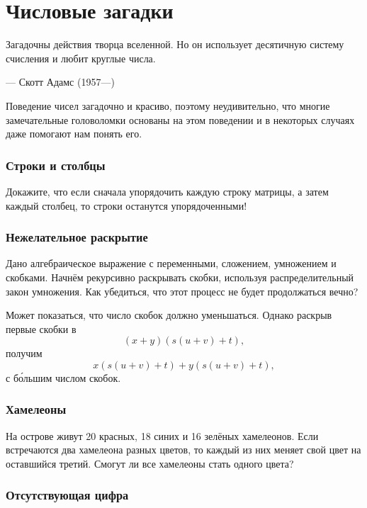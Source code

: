\chapter{Числовые загадки}



\setlength{\epigraphwidth}{.70\textwidth}
\epigraph{Загадочны действия творца вселенной.
Но он использует десятичную систему счисления и любит круглые
числа.
}{--- Скотт Адамс (1957---)}


Поведение чисел загадочно и красиво, поэтому неудивительно, что многие замечательные головоломки основаны на этом поведении и в некоторых случаях даже помогают нам понять его.

\subsection*{Строки и столбцы}

Докажите, что если сначала упорядочить каждую строку матрицы, а затем каждый столбец, то строки останутся упорядоченными!

\subsection*{Нежелательное раскрытие}

Дано алгебраическое выражение с переменными, сложением, умножением и скобками.
Начнём рекурсивно раскрывать скобки, используя распределительный закон умножения.
Как убедиться, что этот процесс не будет продолжаться вечно?

Может показаться, что число скобок должно уменьшаться.
Однако раскрыв первые скобки в
\[(x + y)(s(u + v) + t),\]
получим
\[x(s(u + v) + t) + y(s(u + v) + t),\]
с б\'{о}льшим числом скобок.

\subsection*{Хамелеоны}\label{Хамелеоны}

На острове живут 20 красных, 18 синих и 16 зелёных хамелеонов.
Если встречаются два хамелеона разных цветов, то каждый из них меняет свой цвет на оставшийся третий.
Смогут ли все хамелеоны стать одного цвета?

\subsection*{Отсутствующая цифра}

